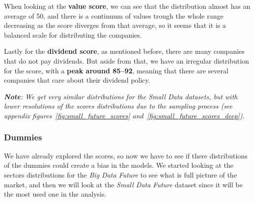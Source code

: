\documentclass[11pt,english,a4paper,hidelinks]{book}
\begin{document}
\vspace{0.5cm}
\noindent When looking at the \textbf{value score}, we can see that the distribution almost has an average of 50, and there is a continuum of values trough the whole range decreasing as the score diverges from that average, so it seems that it is a balanced scale for distributing the companies.

\vspace{0.5cm}
\noindent Lastly for the \textbf{dividend score}, as mentioned before, there are many companies that do not pay dividends. But aside from that, we have an irregular distribution for the score, with a \textbf{peak around 85--92}, meaning that there are several companies that care about their dividend policy.

\vspace{0.5cm}
\noindent \textit{\textbf{Note}: We get very similar distributions for the Small Data datasets, but with lower resolutions of the scores distributions due to the sampling process (see appendix figures~\ref{fig:small_future_scores} and~\ref{fig:small_future_scores_deep}).}

\subsubsection{Dummies}

We have already explored the scores, so now we have to see if there distributions of the dummies could create a bias in the models. We started looking at the sectors distributions for the \textit{Big Data Future} to see what is full picture of the market, and then we will look at the \textit{Small Data Future} dataset since it will be the most used one in the analysis.
\end{document}

